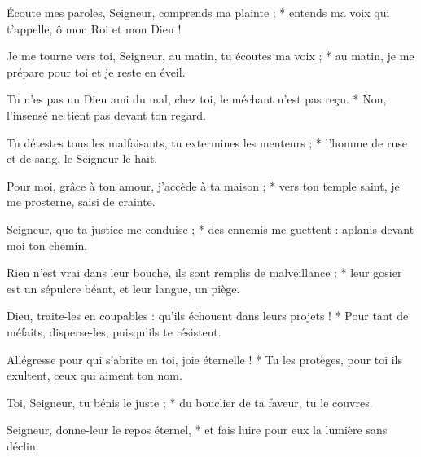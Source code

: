 \item Écoute mes paroles, Seigneur, comprends ma plainte ; * entends ma voix qui t'appelle, ô mon Roi et mon Dieu !

\item Je me tourne vers toi, Seigneur, au matin, tu écoutes ma voix ; * au matin, je me prépare pour toi et je reste en éveil.

\item Tu n'es pas un Dieu ami du mal, chez toi, le méchant n'est pas reçu. * Non, l'insensé ne tient pas devant ton regard. 

\item Tu détestes tous les malfaisants, tu extermines les menteurs ; * l'homme de ruse et de sang, le Seigneur le hait.

\item Pour moi, grâce à ton amour, j'accède à ta maison ; * vers ton temple saint, je me prosterne, saisi de crainte.

\item Seigneur, que ta justice me conduise ; * des ennemis me guettent : aplanis devant moi ton chemin.

\item Rien n'est vrai dans leur bouche, ils sont remplis de malveillance ; * leur gosier est un sépulcre béant, et leur langue, un piège.

\item Dieu, traite-les en coupables : qu'ils échouent dans leurs projets ! * Pour tant de méfaits, disperse-les, puisqu'ils te résistent.

\item Allégresse pour qui s'abrite en toi, joie éternelle ! * Tu les protèges, pour toi ils exultent, ceux qui aiment ton nom.

\item Toi, Seigneur, tu bénis le juste ; * du bouclier de ta faveur, tu le couvres.

\item Seigneur, donne-leur le repos éternel, * et fais luire pour eux la lumière sans déclin.